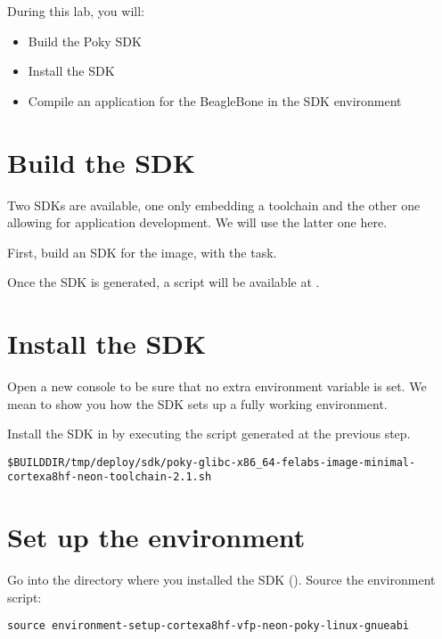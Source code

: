 
During this lab, you will:
\begin{itemize}
  \item Build the Poky SDK
  \item Install the SDK
  \item Compile an application for the BeagleBone in the SDK
    environment
\end{itemize}

\section{Build the SDK}

Two SDKs are available, one only embedding a toolchain and the
other one allowing for application development. We will use the latter one
here.

First, build an SDK for the  image, with
the  task.

Once the SDK is generated, a script will be available at
.

\section{Install the SDK}

Open a new console to be sure that no extra environment variable is set.
We mean to show you how the SDK sets up a fully working environment.

Install the SDK in  by executing the script
generated at the previous step.

{\footnotesize
\begin{verbatim}
$BUILDDIR/tmp/deploy/sdk/poky-glibc-x86_64-felabs-image-minimal-cortexa8hf-neon-toolchain-2.1.sh
\end{verbatim}
}

\section{Set up the environment}

Go into the directory where you installed the SDK
(). Source the environment script:
\begin{verbatim}
source environment-setup-cortexa8hf-vfp-neon-poky-linux-gnueabi
\end{verbatim}

